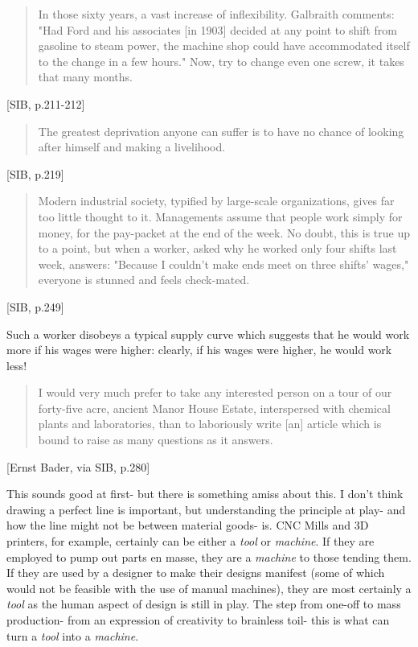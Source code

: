 \begin{quote}
  In those sixty years, a vast increase of inflexibility. Galbraith comments: "Had Ford and his associates [in 1903] decided at any point to shift from gasoline to steam power, the machine shop could have accommodated itself to the change in a few hours." Now, try to change even one screw, it takes that many months.
\end{quote}[SIB, p.211-212]

\begin{quote}
  The greatest deprivation anyone can suffer is to have no chance of looking after himself and making a livelihood.
\end{quote}[SIB, p.219]

\begin{quote}
  Modern industrial society, typified by large-scale organizations, gives far too little thought to it. Managements assume that people work simply for money, for the pay-packet at the end of the week. No doubt, this is true up to a point, but when a worker, asked why he worked only four shifts last week, answers: "Because I couldn't make ends meet on three shifts' wages," everyone is stunned and feels check-mated.
\end{quote}[SIB, p.249]

Such a worker disobeys a typical supply curve which suggests that he would work more if his wages were higher: clearly, if his wages were higher, he would work less!


\begin{quote}
  I would very much prefer to take any interested person on a tour of our forty-five acre, ancient Manor House Estate, interspersed with chemical plants and laboratories, than to laboriously write [an] article which is bound to raise as many questions as it answers.
\end{quote}[Ernst Bader, via SIB, p.280]











This sounds good at first- but there is something amiss about this. I don't think drawing a perfect line is important, but understanding the principle at play- and how the line might not be between material goods- is. CNC Mills and 3D printers, for example, certainly can be either a \textit{tool} or \textit{machine}. If they are employed to pump out parts en masse, they are a \textit{machine} to those tending them. If they are used by a designer to make their designs manifest (some of which would not be feasible with the use of manual machines), they are most certainly a \textit{tool} as the human aspect of design is still in play. The step from one-off to mass production- from an expression of creativity to brainless toil- this is what can turn a \textit{tool} into a \textit{machine}.